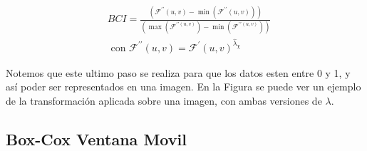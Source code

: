     $$    
    \begin{aligned}
        &B C I=\frac{\left(\mathcal{F}^{\prime \prime}(u, v)-\min \left(\mathcal{F}^{\prime \prime}(u, v)\right)\right)}{\left(\max \left(\mathcal{F}^{\prime \prime(u, v)}\right)-\min \left(\mathcal{F}^{\prime \prime(u, v)}\right)\right)}\\
        &\text { con } \mathcal{F}^{\prime \prime}(u, v)=\mathcal{F}^{\prime}(u, v)^{\hat{\lambda}_{\chi}}
    \end{aligned}
    $$
    
    Notemos que este ultimo paso se realiza para que los datos esten entre 0 y 1, y as\'i poder ser representados en una imagen. En la Figura se puede ver un ejemplo de la transformaci\'on aplicada sobre una imagen, con ambas versiones de $\lambda$.

    \subsection[short]{Box-Cox Ventana Movil}

    
    
    